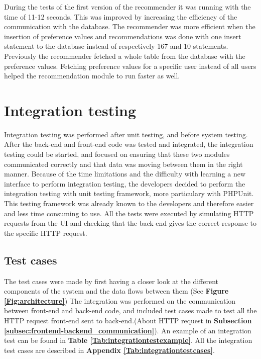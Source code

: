 During the tests of the first version of the recommender it was running with the time of 11-12 seconds. This was improved by increasing the efficiency of the communication with the database. The recommender was more efficient when the insertion of preference values and recommendations was done with one insert statement to the database instead of respectively 167 and 10 statements. Previously the recommender fetched a whole table from the database with the preference values. Fetching preference values for a specific user instead of all users helped the recommendation module to run faster as well.

\section{Integration testing}
\label{sec:integration_testing}

Integration testing was performed after unit testing, and before system testing. After the back-end and front-end code was tested and integrated, the integration testing could be started, and focused on ensuring that these two modules communicated correctly and that data was moving between them in the right manner. 
Because of the time limitations and the difficulty with learning a new interface to perform integration testing, the developers decided to perform the integration testing with unit testing framework, more particulary with PHPUnit. This testing framework was already known to the developers and therefore easier and less time consuming to use. All the tests were executed by simulating HTTP requests from the UI and checking that the back-end gives the correct response to the specific HTTP request. 



\subsection{Test cases}
The test cases were made by first having a closer look at the different components of the system and the data flows between them (See \textbf{Figure \ref{Fig:architecture}}) 
The integration was performed on the communication between front-end and back-end code, and included test cases made to test all the HTTP request front-end sent to back-end.(About HTTP request in \textbf{Subsection \ref{subsec:frontend-backend_communication}}).
An example of an integration test can be found in \textbf{Table \ref{Tab:integrationtestexample}}. All the integration test cases are described in \textbf{Appendix \ref{Tab:integrationtestcases}}.

